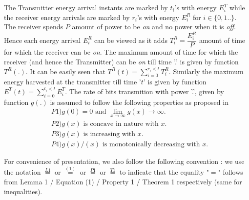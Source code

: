 The Transmitter energy arrival instants are marked by $t_i$'s with energy $E^{T}_i$ while the receiver energy arrivals are marked by $r_i$'s with energy $E^{R}_i$ for $i \in \{0,1..\}$. The receiver spends $P$ amount of power to be \textit{on} and no power when it is \textit{off}. Hence each energy arrival $E^{R}_i$ can be viewed as it adds $T^{R}_i=\dfrac{E^{R}_i}{P}$ amount of time for which the receiver can be \textit{on}. The maximum amount of time for which the receiver (and hence the Transmitter) can be \textit{on} till time '.' is given by function $T^{R}(.)$. It can be easily seen that $T^{R}(t)=\sum_{i=0}^{r_i<t}T^{R}_i$. Similarly the maximum energy harvested at the transmitter till time '$t$' is given by function $E^{T}(t)=\sum_{i=0}^{t_i<t}E^{T}_i$. The rate of bits transmition with power '.', given by function $g(.)$ is assumed to follow the following properties as proposed in \cite{Yang} 
\begin{align}
&P1) g(0)=0\text{ and }\lim_{x\rightarrow \infty} g(x)\rightarrow \infty.
\\
&P2) g(x)\text{ is concave in nature with } x.
\\
&P3) g(x)\text{ is increasing with } x.
\\ 
&P4) g(x)/(x) \text{ is monotonically decreasing with } x.
\end{align}

For convenience of presentation, we also follow the following convention : we use the notation $\stackrel{L1}{=}$ or $\stackrel{(1)}{=}$ or $\stackrel{P1}{=}$ or $\stackrel{T1}{=}$ to indicate that the equality "$=$" follows from Lemma 1 / Equation (1) / Property 1 / Theorem 1 respectively (same for inequalities).